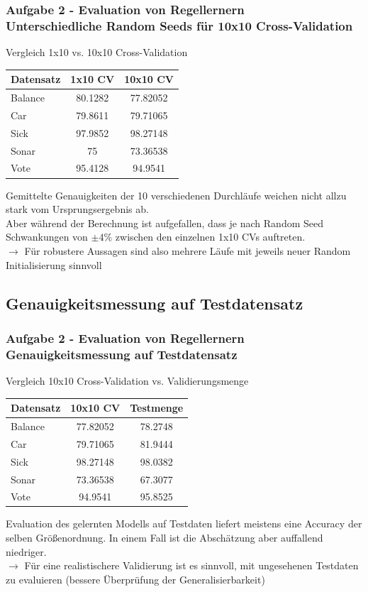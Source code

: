 \documentclass[accentcolor=tud6b,colorbacktitle,inverttitle,landscape,german,presentation,t]{tudbeamer}
\begin{document}
    \begin{frame}[t]
    \frametitle{Aufgabe 2 - Evaluation von Regellernern\\ Unterschiedliche Random Seeds für 10x10 Cross-Validation}
        Vergleich 1x10 vs. 10x10 Cross-Validation
        \vfill
        \begin{tabular}[htbp]{l||c|c}
            Datensatz & 1x10 CV & 10x10 CV \\
            \hline
            \hline
            Balance & 80.1282 & 77.82052 \\
            \hline
            Car & 79.8611 & 79.71065 \\
            \hline
            Sick & 97.9852 & 98.27148 \\
            \hline
            Sonar & 75 & 73.36538 \\
            \hline
            Vote & 95.4128 & 94.9541 \\
        \end{tabular}
        \vfill
        Gemittelte Genauigkeiten der 10 verschiedenen Durchläufe weichen nicht allzu stark vom Ursprungsergebnis ab.\\
        Aber während der Berechnung ist aufgefallen, dass je nach Random Seed Schwankungen von $\pm 4\%$ zwischen den einzelnen 1x10 CVs auftreten.\\
        $\rightarrow$ Für robustere Aussagen sind also mehrere Läufe mit jeweils neuer Random Initialisierung sinnvoll
    \end{frame}
    
    \subsection{Genauigkeitsmessung auf Testdatensatz}
    
    \begin{frame}[t]
    \frametitle{Aufgabe 2 - Evaluation von Regellernern\\ Genauigkeitsmessung auf Testdatensatz}
        Vergleich 10x10 Cross-Validation vs. Validierungsmenge
        \vfill
        \begin{tabular}[htbp]{l||c|c}
            Datensatz & 10x10 CV & Testmenge \\
            \hline
            \hline
            Balance & 77.82052 & 78.2748 \\
            \hline
            Car & 79.71065 & 81.9444 \\
            \hline
            Sick & 98.27148 & 98.0382 \\
            \hline
            Sonar & 73.36538 & 67.3077 \\
            \hline
            Vote & 94.9541 & 95.8525 \\
        \end{tabular}
        \vfill
        Evaluation des gelernten Modells auf Testdaten liefert meistens eine Accuracy der selben Größenordnung.
        In einem Fall ist die Abschätzung aber auffallend niedriger.\\
        $\rightarrow$ Für eine realistischere Validierung ist es sinnvoll, mit ungesehenen Testdaten zu evaluieren (bessere Überprüfung der Generalisierbarkeit)
    \end{frame}
    
\end{document}
